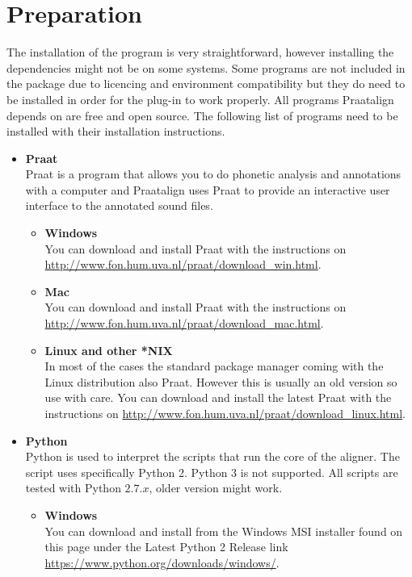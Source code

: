 \section{Preparation}
The installation of the program is very straightforward, however installing the
dependencies might not be on some systems. Some programs are not included in
the package due to licencing and environment compatibility but they do need to
be installed in order for the plug-in to work properly. All programs Praatalign
depends on are free and open source. The following list of programs need to be
installed with their installation instructions.
\begin{itemize}
	\item \textbf{Praat}\\
		Praat is a program that allows you to do phonetic analysis and annotations
		with a computer and Praatalign uses Praat to provide an interactive user
		interface to the annotated sound files.
		\begin{itemize}
			\item \textbf{Windows}\\
				You can download and install Praat with the instructions on
				\url{http://www.fon.hum.uva.nl/praat/download_win.html}.
			\item \textbf{Mac}\\
				You can download and install Praat with the instructions on
				\url{http://www.fon.hum.uva.nl/praat/download_mac.html}.
			\item \textbf{Linux and other *NIX}\\
				In most of the cases the standard package manager coming with the
				Linux distribution also Praat. However this is usually an old version
				so use with care. You can download and install the latest Praat with
				the instructions on
				\url{http://www.fon.hum.uva.nl/praat/download_linux.html}.
		\end{itemize}
	\item \textbf{Python}\\
		Python is used to interpret the scripts that run the core of the aligner.
		The script uses specifically Python 2. Python 3 is not supported. All
		scripts are tested with Python $2.7.x$, older version might work.
		\begin{itemize}
			\item \textbf{Windows}\\
				You can download and install from the Windows MSI installer found on
				this page under the Latest Python 2 Release link
				\url{https://www.python.org/downloads/windows/}.

\end{itemize}
\end{itemize}
